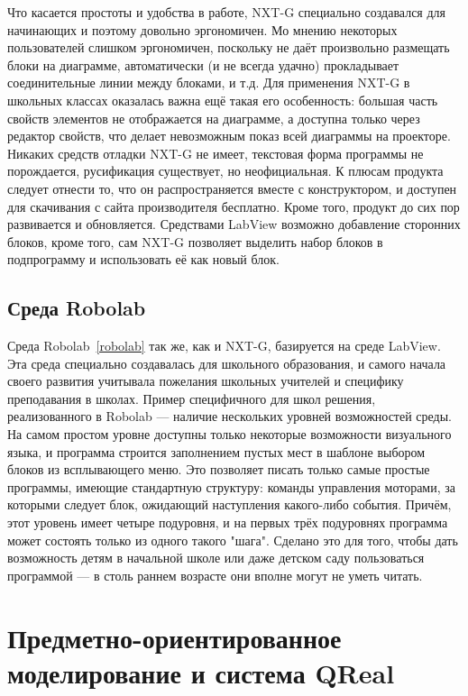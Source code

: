 \documentclass[a4paper]{article}
\begin{document}
Что касается простоты и удобства в работе, NXT-G специально создавался для начинающих и поэтому довольно эргономичен. Мо мнению некоторых пользователей слишком эргономичен, поскольку не даёт произвольно размещать блоки на диаграмме, автоматически (и не всегда удачно) прокладывает соединительные линии между блоками, и т.д. Для применения NXT-G в школьных классах оказалась важна ещё такая его особенность: большая часть свойств элементов не отображается на диаграмме, а доступна только через редактор свойств, что делает невозможным показ всей диаграммы на проекторе. Никаких средств отладки NXT-G не имеет, текстовая форма программы не порождается, русификация существует, но неофициальная. К плюсам продукта следует отнести то, что он распространяется вместе с конструктором, и доступен для скачивания с сайта производителя бесплатно. Кроме того, продукт до сих пор развивается и обновляется. Средствами LabView возможно добавление сторонних блоков, кроме того, сам NXT-G позволяет выделить набор блоков в подпрограмму и использовать её как новый блок.

\subsection{Среда Robolab}
Среда Robolab~\ref{robolab} так же, как и NXT-G, базируется на среде LabView. Эта среда специально создавалась для школьного образования, и самого начала своего развития учитывала пожелания школьных учителей и специфику преподавания в школах. Пример специфичного для школ решения, реализованного в Robolab --- наличие нескольких уровней возможностей среды. На самом простом уровне доступны только некоторые возможности визуального языка, и программа строится заполнением пустых мест в шаблоне выбором блоков из всплывающего меню. Это позволяет писать только самые простые программы, имеющие стандартную структуру: команды управления моторами, за которыми следует блок, ожидающий наступления какого-либо события. Причём, этот уровень имеет четыре подуровня, и на первых трёх подуровнях программа может состоять только из одного такого "шага". Сделано это для того, чтобы дать возможность детям в начальной школе или даже детском саду пользоваться программой --- в столь раннем возрасте они вполне могут не уметь читать.

\section{Предметно-ориентированное моделирование и система QReal}
\end{document}
